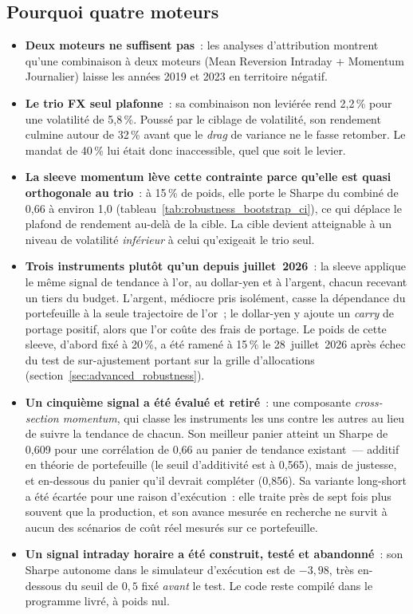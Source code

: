 \subsection{Pourquoi quatre moteurs}

\begin{itemize}
\item \textbf{Deux moteurs ne suffisent pas}~: les analyses d'attribution montrent qu'une combinaison à deux moteurs (Mean Reversion Intraday + Momentum Journalier) laisse les années 2019 et 2023 en territoire négatif.
\item \textbf{Le trio FX seul plafonne}~: sa combinaison non leviérée rend 2,2\,\% pour une volatilité de 5,8\,\%. Poussé par le ciblage de volatilité, son rendement culmine autour de 32\,\% avant que le \emph{drag} de variance ne le fasse retomber. Le mandat de 40\,\% lui était donc inaccessible, quel que soit le levier.
\item \textbf{La sleeve momentum lève cette contrainte parce qu'elle est quasi orthogonale au trio}~: à 15\,\% de poids, elle porte le Sharpe du combiné de 0,66 à environ 1,0 (tableau~\ref{tab:robustness_bootstrap_ci}), ce qui déplace le plafond de rendement au-delà de la cible. La cible devient atteignable à un niveau de volatilité \emph{inférieur} à celui qu'exigeait le trio seul.
\item \textbf{Trois instruments plutôt qu'un depuis juillet~2026}~: la sleeve applique le même signal de tendance à l'or, au dollar-yen et à l'argent, chacun recevant un tiers du budget. L'argent, médiocre pris isolément, casse la dépendance du portefeuille à la seule trajectoire de l'or~; le dollar-yen y ajoute un \emph{carry} de portage positif, alors que l'or coûte des frais de portage. Le poids de cette sleeve, d'abord fixé à 20\,\%, a été ramené à 15\,\% le 28~juillet~2026 après échec du test de sur-ajustement portant sur la grille d'allocations (section~\ref{sec:advanced_robustness}).
\item \textbf{Un cinquième signal a été évalué et retiré}~: une composante \emph{cross-section momentum}, qui classe les instruments les uns contre les autres au lieu de suivre la tendance de chacun. Son meilleur panier atteint un Sharpe de 0,609 pour une corrélation de 0,66 au panier de tendance existant~--- additif en théorie de portefeuille (le seuil d'additivité est à 0,565), mais de justesse, et en-dessous du panier qu'il devrait compléter (0,856). Sa variante long-short a été écartée pour une raison d'exécution~: elle traite près de sept fois plus souvent que la production, et son avance mesurée en recherche ne survit à aucun des scénarios de coût réel mesurés sur ce portefeuille.
\item \textbf{Un signal intraday horaire a été construit, testé et abandonné}~: son Sharpe autonome dans le simulateur d'exécution est de $-3{,}98$, très en-dessous du seuil de $0{,}5$ fixé \emph{avant} le test. Le code reste compilé dans le programme livré, à poids nul.
\end{itemize}

